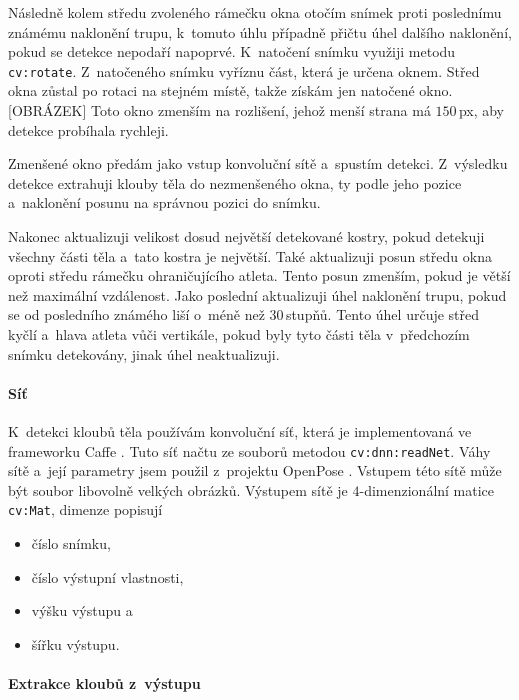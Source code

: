 Následně kolem středu zvoleného rámečku okna otočím snímek proti poslednímu známému naklonění trupu, k~tomuto úhlu případně přičtu úhel dalšího naklonění, pokud se detekce nepodaří napoprvé. K~natočení snímku využiji metodu \texttt{cv\::rotate}. Z~natočeného snímku vyříznu část, která je určena oknem. Střed okna zůstal po rotaci na stejném místě, takže získám jen natočené okno. [OBRÁZEK] Toto okno zmenším na rozlišení, jehož menší strana má $150$\,\rm px, aby detekce probíhala rychleji.

Zmenšené okno předám jako vstup konvoluční sítě a~spustím detekci. Z~výsledku detekce extrahuji klouby těla do nezmenšeného okna, ty podle jeho pozice a~naklonění posunu na správnou pozici do snímku.

Nakonec aktualizuji velikost dosud největší detekované kostry, pokud detekuji všechny části těla a~tato kostra je největší. Také aktualizuji posun středu okna oproti středu rámečku ohraničujícího atleta. Tento posun zmenším, pokud je větší než maximální vzdálenost. Jako poslední aktualizuji úhel naklonění trupu, pokud se od posledního známého liší o~méně než $30$\,\rm stupňů. Tento úhel určuje střed kyčlí a~hlava atleta vůči vertikále, pokud byly tyto části těla v~předchozím snímku detekovány, jinak úhel neaktualizuji.

\paragraph{Síť}

K~detekci kloubů těla používám konvoluční síť, která je implementovaná ve frameworku Caffe \citep{Caffe}. Tuto síť načtu ze souborů metodou \texttt{cv\::dnn\::readNet}. Váhy sítě a~její parametry jsem použil z~projektu OpenPose \citep{OpenPose}. Vstupem této sítě může být soubor libovolně velkých obrázků. Výstupem sítě je $4$-dimenzionální matice \texttt{cv\::Mat}, dimenze popisují
\begin{itemize}
    \item číslo snímku,
    \item číslo výstupní vlastnosti,
    \item výšku výstupu a
    \item šířku výstupu.
\end{itemize}

\paragraph{Extrakce kloubů z~výstupu}

